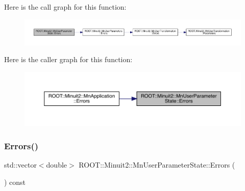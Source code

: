 Here is the call graph for this function\+:
\nopagebreak
\begin{figure}[H]
\begin{center}
\leavevmode
\includegraphics[width=350pt]{d3/de0/classROOT_1_1Minuit2_1_1MnUserParameterState_ae054d826075fa4fb7dac12a60afdef63_cgraph}
\end{center}
\end{figure}
Here is the caller graph for this function\+:
\nopagebreak
\begin{figure}[H]
\begin{center}
\leavevmode
\includegraphics[width=350pt]{d3/de0/classROOT_1_1Minuit2_1_1MnUserParameterState_ae054d826075fa4fb7dac12a60afdef63_icgraph}
\end{center}
\end{figure}
\mbox{\label{classROOT_1_1Minuit2_1_1MnUserParameterState_aa8302ffe35dba71f7a6e0131957ec6e4}} 
\subsubsection{\texorpdfstring{Errors()}{Errors()}\hspace{0.1cm}{\footnotesize\ttfamily [3/3]}}
{\footnotesize\ttfamily std\+::vector$<$double$>$ R\+O\+O\+T\+::\+Minuit2\+::\+Mn\+User\+Parameter\+State\+::\+Errors (\begin{DoxyParamCaption}{ }\end{DoxyParamCaption}) const}

\mbox{\label{classROOT_1_1Minuit2_1_1MnUserParameterState_a8e0b79e3a150b2ccd15678755b1adb4a}} 
